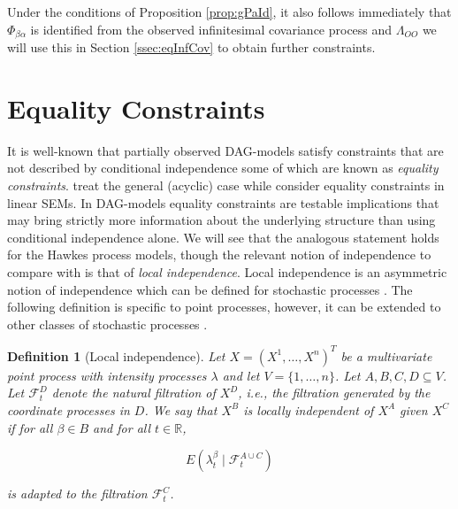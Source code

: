 \documentclass[accepted]{uai2021} %
\newtheorem{defn}[thm]{Definition}
\begin{document}
Under the conditions of Proposition \ref{prop:gPaId}, it also follows 
immediately that $\Phi_{\beta\alpha}$ is identified from the observed 
infinitesimal covariance process and $\Lambda_{OO}$ we will use this in Section 
\ref{ssec:eqInfCov} to obtain further constraints.


\section{Equality Constraints}
\label{sec:eq}

It is well-known that partially observed DAG-models satisfy 
constraints that 
are not described by conditional independence some of which are known as 
\emph{equality constraints}. \cite{richardson2017} treat the general (acyclic) 
case 
while \cite{chen2014, chenNIPS2016} consider equality constraints in linear 
SEMs. In DAG-models equality constraints are testable implications that may 
bring strictly more information about the underlying structure than using 
conditional independence alone. We will see that the analogous statement holds 
for the Hawkes process models, though the relevant notion of independence to 
compare with is 
that of \emph{local independence}. Local independence is an asymmetric notion 
of independence which can be defined 
for stochastic processes \citep{schweder1970, aalen1987, didelez2000, 
didelez2008}. The following definition is specific to point processes, however, 
it can be extended to other classes of stochastic processes 
\citep{aalen1987,didelez2006,mogensenUAI2018,mogensen2018}.

\begin{defn}[Local independence]
	Let $X = (X^1,\ldots,X^n)^T$ be a multivariate point process with intensity 
	processes $\lambda$ and let $V=\{1,\ldots,n\}$. Let $A,B,C,D \subseteq V$. 
	Let $\mathcal{F}_t^D$ denote the natural filtration of $X^D$, i.e., the 
	filtration generated by the coordinate processes in $D$. We say that $X^B$ 
	is \emph{locally independent of $X^A$ given $X^C$} if for all $\beta\in B$ 
	and 
	for all $t\in \mathbb{R}$,
	
	$$
	E(\lambda_t^\beta \mid \mathcal{F}_t^{A\cup C})
	$$
	
	is adapted to the filtration $\mathcal{F}_t^C$.
	\label{def:li}
\end{defn}
\end{document}
